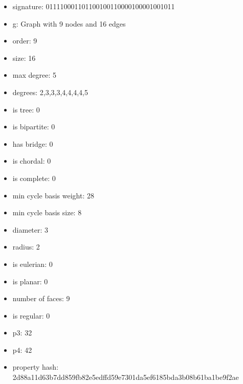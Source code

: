 \newpage
\begin{figure}
\end{figure}
\begin{itemize}
\item signature: 011110001101100100110000100001001011
\item g: Graph with 9 nodes and 16 edges
\item order: 9
\item size: 16
\item max degree: 5
\item degrees: 2,3,3,3,4,4,4,4,5
\item is tree: 0
\item is bipartite: 0
\item has bridge: 0
\item is chordal: 0
\item is complete: 0
\item min cycle basis weight: 28
\item min cycle basis size: 8
\item diameter: 3
\item radius: 2
\item is eulerian: 0
\item is planar: 0
\item number of faces: 9
\item is regular: 0
\item p3: 32
\item p4: 42
\item property hash: 2d88a11d63b7dd859fb82e5edffd59e7301da5ef6185bda3b08b61ba1be9f2ae
\end{itemize}
